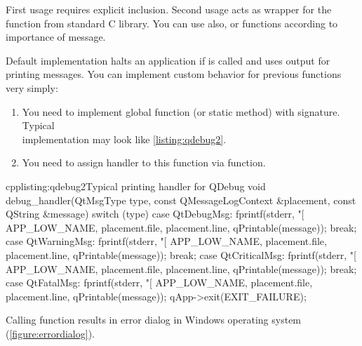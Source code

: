 First usage requires explicit inclusion. Second usage acts as wrapper for the function from standard C library. You can use also, or functions according to importance of message.

Default implementation halts an application if is called and uses output for printing messages. You can implement custom behavior for previous functions very simply:
\begin{enumerate}
\item
You need to implement global function (or static method) with signature. Typical\\ implementation may look like \autoref{listing:qdebug2}.

\item
You need to assign handler to this function via function.
\end{enumerate}

\begin{fdoccode}{cpp}{listing:qdebug2}{Typical printing handler for QDebug}
void debug_handler(QtMsgType type, const QMessageLogContext &placement, const QString &message) {
    switch (type) {
	case QtDebugMsg:
	    fprintf(stderr, "[%
		    APP_LOW_NAME,
		    placement.file,
		    placement.line,
		    qPrintable(message));
	    break;
	case QtWarningMsg:
	    fprintf(stderr, "[%
		    APP_LOW_NAME,
		    placement.file,
		    placement.line,
		    qPrintable(message));
	    break;
	case QtCriticalMsg:
	    fprintf(stderr, "[%
		    APP_LOW_NAME,
		    placement.file,
		    placement.line,
		    qPrintable(message));
	    break;
	case QtFatalMsg:
	    fprintf(stderr, "[%
		    APP_LOW_NAME,
		    placement.file,
		    placement.line,
		    qPrintable(message));
	    qApp->exit(EXIT_FAILURE);
    }
}
\end{fdoccode}

Calling function results in error dialog in Windows operating system (\autoref{figure:errordialog}).

